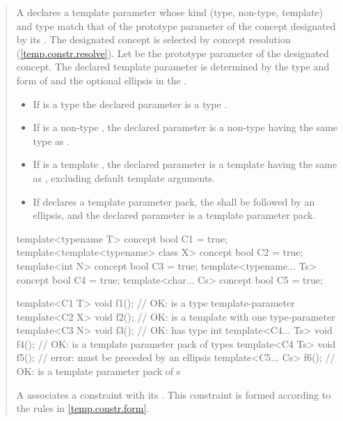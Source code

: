 \begin{quote}
\setcounter{Paras}{8}
\pnum
A  declares a template parameter whose 
kind (type, non-type, template) and type match that of the prototype parameter 
of the concept designated by its .
% 
The designated concept is selected by concept resolution 
(\ref{temp.constr.resolve}).
% 
Let  be the prototype parameter of the designated
concept. The declared template parameter is determined by the type
and form of  and the optional ellipsis in the
.
% 
\begin{itemize}
\item If  is a type  the declared
parameter is a type . 

\item If  is a non-type , the declared
parameter is a non-type  having the same 
type as .

\item If  is a template , the declared
parameter is a template  having the same 
 as , excluding default template 
arguments.

\item If  declares a template parameter pack, the 
 shall be followed by an ellipsis,
and the declared parameter is a template parameter pack. 
\end{itemize}
% 
\enterexample
\begin{codeblock}
template<typename T> concept bool C1 = true;
template<template<typename> class X> concept bool C2 = true;
template<int N> concept bool C3 = true;
template<typename... Ts> concept bool C4 = true;
template<char... Cs> concept bool C5 = true;

template<C1 T> void f1();     // OK:  is a type template-parameter
template<C2 X> void f2();     // OK:  is a template with one type-parameter
template<C3 N> void f3();     // OK:  has type int
template<C4... Ts> void f4(); // OK:  is a template parameter pack of types
template<C4 Ts> void f5();    // error:  must be preceded by an ellipsis
template<C5... Cs> f6();      // OK:  is a template parameter pack of s
\end{codeblock}
\exitexample

\pnum
A  associates a
constraint with its .
% 
This constraint is formed according to the rules in \ref{temp.constr.form}.
\end{quote}

